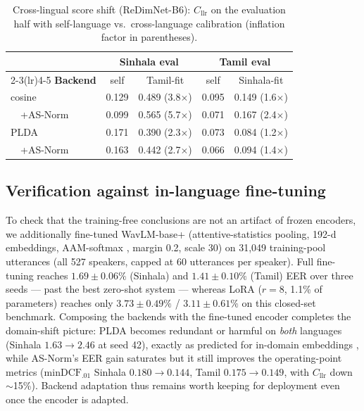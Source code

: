\documentclass[journal]{IEEEtran}
\newcommand{\dcf}{\mathrm{minDCF}}
\newcommand{\cllr}{C_{\mathrm{llr}}}
\begin{document}
\begin{table}[!t]
\renewcommand{\arraystretch}{1.1}
\caption{Cross-lingual score shift (ReDimNet-B6): $\cllr$ on the
evaluation half with self-language vs.\ cross-language calibration
(inflation factor in parentheses).}
\label{tab:calib}
\centering
\small
\setlength{\tabcolsep}{3.4pt}
\begin{tabular}{l cc cc}
\toprule
& \multicolumn{2}{c}{\textbf{Sinhala eval}} & \multicolumn{2}{c}{\textbf{Tamil eval}} \\
\cmidrule(lr){2-3}\cmidrule(lr){4-5}
\textbf{Backend} & self & Tamil-fit & self & Sinhala-fit \\
\midrule
cosine        & 0.129 & 0.489 (3.8$\times$) & 0.095 & 0.149 (1.6$\times$) \\
\ \ +AS-Norm  & 0.099 & 0.565 (5.7$\times$) & 0.071 & 0.167 (2.4$\times$) \\
PLDA          & 0.171 & 0.390 (2.3$\times$) & 0.073 & 0.084 (1.2$\times$) \\
\ \ +AS-Norm  & 0.163 & 0.442 (2.7$\times$) & 0.066 & 0.094 (1.4$\times$) \\
\bottomrule
\end{tabular}
\end{table}

\subsection{Verification against in-language fine-tuning}
\label{ssec:finetune}

To check that the training-free conclusions are not an artifact of
frozen encoders, we additionally fine-tuned WavLM-base+
\cite{chen2022wavlm} (attentive-statistics pooling, 192-d embeddings,
AAM-softmax \cite{deng2019arcface}, margin 0.2, scale 30) on
31{,}049 training-pool utterances (all 527 speakers, capped at 60
utterances per speaker). Full fine-tuning reaches
$1.69\pm0.06\%$ (Sinhala) and $1.41\pm0.10\%$ (Tamil) EER over three
seeds --- past the best zero-shot system --- whereas LoRA
\cite{hu2022lora} ($r{=}8$, 1.1\% of parameters) reaches only
$3.73\pm0.49\%$ / $3.11\pm0.61\%$ on this closed-set benchmark.
Composing the backends with the fine-tuned encoder completes the
domain-shift picture: PLDA becomes redundant or harmful on
\emph{both} languages (Sinhala $1.63\to2.46$ at seed 42), exactly as
predicted for in-domain embeddings \cite{wang2022scoring}, while
AS-Norm's EER gain saturates but it still improves the
operating-point metrics ($\dcf_{.01}$ Sinhala $0.180\to0.144$, Tamil
$0.175\to0.149$, with $\cllr$ down $\sim$15\%). Backend adaptation
thus remains worth keeping for deployment even once the encoder is
adapted.
\end{document}
